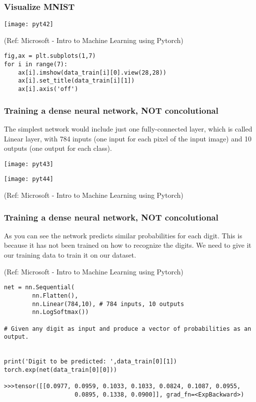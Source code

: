 \begin{frame}[fragile] \frametitle{Visualize MNIST}

\begin{center}
\texttt{[image: pyt42]}
\end{center}


\tiny{(Ref: Microsoft - Intro to Machine Learning using Pytorch)}

\begin{lstlisting}
fig,ax = plt.subplots(1,7)
for i in range(7):
    ax[i].imshow(data_train[i][0].view(28,28))
    ax[i].set_title(data_train[i][1])
    ax[i].axis('off')
\end{lstlisting}


\end{frame}


\begin{frame}[fragile] \frametitle{Training a dense neural network, NOT concolutional}

The simplest network would include just one fully-connected layer, which is called Linear layer, with 784 inputs (one input for each pixel of the input image) and 10 outputs (one output for each class).

\begin{center}
\texttt{[image: pyt43]}

\texttt{[image: pyt44]}

\end{center}


\tiny{(Ref: Microsoft - Intro to Machine Learning using Pytorch)}
\end{frame}

\begin{frame}[fragile] \frametitle{Training a dense neural network, NOT concolutional}

As you can see the network predicts similar probabilities for each digit. This is because it has not been trained on how to recognize the digits. We need to give it our training data to train it on our dataset.

\tiny{(Ref: Microsoft - Intro to Machine Learning using Pytorch)}

\begin{lstlisting}
net = nn.Sequential(
        nn.Flatten(), 
        nn.Linear(784,10), # 784 inputs, 10 outputs
        nn.LogSoftmax())

# Given any digit as input and produce a vector of probabilities as an output.


print('Digit to be predicted: ',data_train[0][1])
torch.exp(net(data_train[0][0]))

>>>tensor([[0.0977, 0.0959, 0.1033, 0.1033, 0.0824, 0.1087, 0.0955, 
					0.0895, 0.1338, 0.0900]], grad_fn=<ExpBackward>)
\end{lstlisting}


\end{frame}

